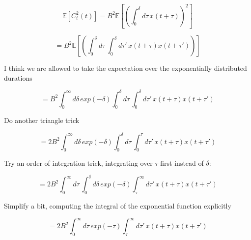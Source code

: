 \documentclass[12pt]{article}
\begin{document}
$$\mathbb{E}[C^2_i(t)] = B^2 \mathbb{E}\left[\left(
  \int_{0}^{\delta}{d\tau\, x(t+\tau)}\right)^2
  \right]$$

$$ = B^2 \mathbb{E}\left[\left(
  \int_{0}^{\delta}{d\tau\,\int_{0}^{\delta}{d\tau'\, x(t+\tau) x(t+\tau')}}\right)
  \right]$$

I think we are allowed to take the expectation over the exponentially distributed durations

$$= B^2 \int_{0}^{\infty}{d\delta\, exp(-\delta)\int_{0}^{\delta}{d\tau\,\int_{0}^{\delta}{d\tau'\, x(t+\tau) x(t+\tau')}}}$$

Do another triangle trick

$$= 2B^2 \int_{0}^{\infty}{d\delta\, exp(-\delta)\int_{0}^{\delta}{d\tau\,\int_{0}^{\tau}{d\tau'\, x(t+\tau) x(t+\tau')}}}$$

Try an order of integration trick, integrating over $\tau$ first instead of $\delta$:

$$= 2B^2 \int_{0}^{\infty}{
  d\tau\, \int_{0}^{\delta}{
  d\delta\,exp(-\delta) \int_{\tau}^{\infty}{
  d\tau'\, x(t+\tau) x(t+\tau')}}}$$

Simplify a bit, computing the integral of the exponential function explicitly

$$= 2B^2 \int_{0}^{\infty}{
  d\tau\, exp(-\tau) \int_{\tau}^{\infty}{
  d\tau'\, x(t+\tau) x(t+\tau')}}$$
\end{document}
